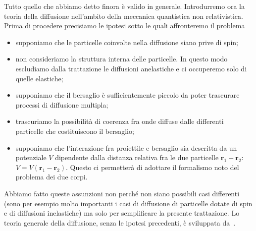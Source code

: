 \documentclass[a4paper,fleqn,twoside,12pt]{article}
\begin{document}
Tutto quello che abbiamo detto finora è valido in generale.  Introdurremo ora la
teoria della diffusione nell'ambito della meccanica quantistica non
relativistica.  Prima di procedere precisiamo le ipotesi sotto le quali
affronteremo il problema
\begin{itemize}
\item supponiamo che le particelle coinvolte nella diffusione siano prive di
  spin;
\item non consideriamo la struttura interna delle particelle.  In questo modo
  escludiamo dalla trattazione le diffusioni anelastiche e ci occuperemo solo di
  quelle elastiche;
\item supponiamo che il bersaglio è sufficientemente piccolo da poter trascurare
  processi di diffusione multipla;
\item trascuriamo la possibilità di coerenza fra onde diffuse dalle differenti
  particelle che costituiscono il bersaglio;
\item supponiamo che l'interazione fra proiettile e bersaglio sia descritta da
  un potenziale $V$ dipendente dalla distanza relativa fra le due particelle
  $\bm{r}_{1} - \bm{r}_{2}$: $V = V(\bm{r}_{1} - \bm{r}_{2})$.  Questo ci
  permetterà di adottare il formalismo noto del problema dei due corpi.
\end{itemize}
Abbiamo fatto queste assunzioni non perché non siano possibili casi differenti
(sono per esempio molto importanti i casi di diffusione di particelle dotate di
spin e di diffusioni inelastiche) ma solo per semplificare la presente
trattazione.  Lo teoria generale della diffusione, senza le ipotesi precedenti,
è sviluppata da~\textcite[433-466]{ballentine:quantum-mechanics}.
\end{document}
